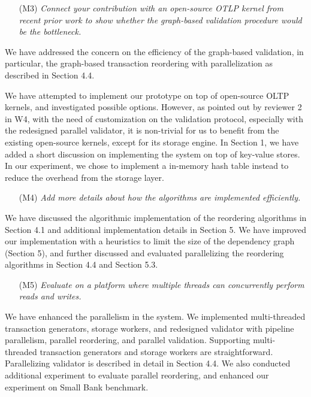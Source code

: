 \documentclass{article}
\begin{document}
\begin{itemize}
\item[(M3)]  \emph{Connect your contribution with an open-source OTLP kernel from recent prior work to show whether the graph-based validation procedure would be the bottleneck.}
\end{itemize}
We have addressed the concern on the efficiency of the graph-based validation, in particular, the graph-based transaction reordering with parallelization as described in Section 4.4. 

We have attempted to implement our prototype on top of open-source OLTP kernels, and investigated possible options. However, as pointed out by reviewer 2 in W4, with the need of customization on the validation protocol, especially with the redesigned parallel validator,  it is non-trivial for us to benefit from the existing open-source kernels, except for its storage engine. In Section 1, we have added a short discussion on implementing the system on top of key-value stores. In our experiment, we chose to implement a in-memory hash table instead to reduce the overhead from the storage layer.

\begin{itemize}
\item[(M4)]  \emph{Add more details about how the algorithms are implemented efficiently.}
\end{itemize}
We have discussed the algorithmic implementation of the reordering algorithms in Section 4.1 and additional implementation details in Section 5. We have improved our implementation with a heuristics to limit the size of the dependency graph (Section 5), and further discussed and evaluated parallelizing the reordering algorithms in Section 4.4 and Section 5.3. 

\begin{itemize}
\item[(M5)]  \emph{Evaluate on a platform where multiple threads can concurrently perform reads and writes.}
\end{itemize}
We have enhanced the parallelism in the system. We implemented multi-threaded transaction generators, storage workers, and redesigned validator with pipeline parallelism, parallel reordering, and parallel validation. Supporting multi-threaded transaction generators and storage workers are straightforward. Parallelizing validator is described in detail in Section 4.4. We also conducted additional experiment to evaluate parallel reordering, and enhanced our experiment on Small Bank benchmark.
\end{document}
